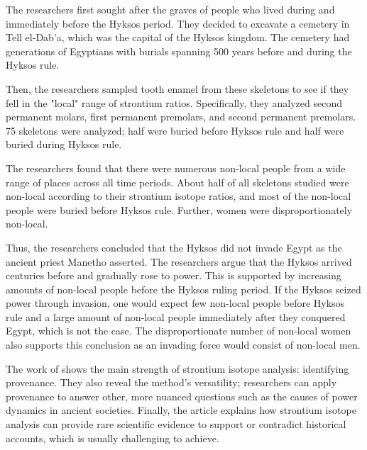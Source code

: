 \documentclass[a4paper, 12pt]{article}
\begin{document}
The researchers first sought after the graves of people who lived during and immediately
before the Hyksos period. They decided to excavate a cemetery in Tell el-Dab'a,
which was the capital of the Hyksos kingdom. The cemetery had generations of Egyptians
with burials spanning 500 years before and during the Hyksos rule.

Then, the researchers sampled tooth enamel from these skeletons to see if they fell
in the "local" range of strontium ratios. Specifically, they analyzed second permanent molars,
first permanent premolars, and second permanent premolars. 75 skeletons were analyzed;
half were buried before Hyksos rule and half were buried during Hyksos rule.

The researchers found that there were numerous non-local people from a wide range
of places across all time periods. About half of all skeletons studied were non-local
according to their strontium isotope ratios, and most of the non-local people were buried
before Hyksos rule. Further, women were disproportionately non-local.

Thus, the researchers concluded that the Hyksos did not invade Egypt
as the ancient priest Manetho asserted. The researchers argue that the Hyksos
arrived centuries before and gradually rose to power. This is supported
by increasing amounts of non-local people before the Hyksos ruling
period. If the Hyksos seized power through invasion, one would expect few non-local
people before Hyksos rule and a large amount of non-local people immediately after they conquered Egypt, which
is not the case. The disproportionate number of non-local women also supports this conclusion
as an invading force would consist of non-local men.

The work of \cite{stantis2020} shows the main strength of strontium isotope analysis:
identifying provenance. They also reveal the method's versatility; researchers can
apply provenance to answer other, more nuanced questions such as the causes of
power dynamics in ancient societies. Finally, the article explains how strontium isotope
analysis can provide rare scientific evidence to support or contradict
historical accounts, which is usually challenging to achieve.
\end{document}

